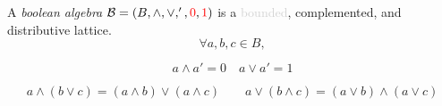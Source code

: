 
\begin{frame}{}
  \begin{definition}
    A {\it boolean algebra} $\mathcal{B} = (B, \land, \lor, ', \textcolor{red}{0}, \textcolor{red}{1})$ is a \textcolor{lightgray}{bounded}, complemented, and distributive lattice.
    \[
      \forall a, b, c \in B,
    \]
    \vspace{-0.50cm}
    \begin{description}[Distributivity:]
      \item[Idempotency:]
      \item[Commutativity:]
      \item[Associativity:]
      \item[Absorption:]
      \item[\red{Complements:}]
        \[
          a \land a' = 0 \quad a \lor a' = 1
        \]
      \item[\red{Distributivity:}]
        \[
          a \land (b \lor c) = (a \land b) \lor (a \land c) \qquad
          a \lor (b \land c) = (a \lor b) \land (a \lor c)
        \]
    \end{description}
  \end{definition}
\end{frame}
